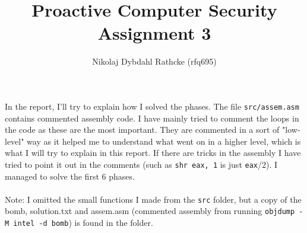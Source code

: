 \documentclass[a4paper]{article}
\author{Nikolaj Dybdahl Rathcke (rfq695)}
\title{Proactive Computer Security \\ Assignment 3}
\begin{document}
\maketitle

In the report, I'll try to explain how I solved the phases. The file \texttt{src/assem.asm} contains commented assembly code. I have mainly tried to comment the loops in the code as these are the most important. They are commented in a sort of "low-level" way as it helped me to understand what went on in a higher level, which is what I will try to explain in this report. If there are tricks in the assembly I have tried to point it out in the comments (such as \texttt{shr eax, 1} is just \texttt{eax}/2). I managed to solve the first $6$ phases. \\
\\
Note: I omitted the small functions I made from the \texttt{src} folder, but a copy of the bomb, solution.txt and assem.asm (commented assembly from running \texttt{objdump -M intel -d bomb}) is found in the folder.
\\
\end{document}
